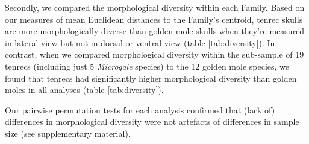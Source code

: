 \documentclass[12pt,a4paper]{article}
\begin{document}
	Secondly, we compared the morphological diversity within each Family. Based on our measures of mean Euclidean distances to the Family's centroid, tenrec skulls are more morphologically diverse than golden mole skulls when they're measured in lateral view but not in dorsal or ventral view (table \ref{tab:diversity}). In contrast, when we compared morphological diversity within the sub-sample of 19 tenrecs (including just 5 \textit{Microgale} species) to the 12 golden mole species, we found that tenrecs had significantly higher morphological diversity than golden moles in all analyses (table \ref{tab:diversity}).

	Our pairwise permutation tests for each analysis confirmed that (lack of) differences in morphological diversity were not artefacts of differences in sample size (see supplementary material).


	\begin{table}[h]			
	\caption[Comparison of morphological diversity in tenrecs and golden moles.]
	 
	\label{tab:diversity}  
	\end{table}
\end{document}
